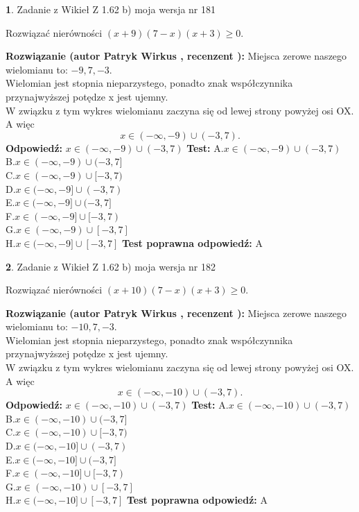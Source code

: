 \documentclass[12pt, a4paper]{article}
\theoremstyle{definition} %
\newtheorem{zad}{}
\newcommand{\zadStart}[1]{\begin{zad}#1\newline}
\newcommand{\zadStop}{\end{zad}}
\newcommand{\rozwStart}[2]{\noindent \textbf{Rozwiązanie (autor #1 , recenzent #2): }\newline}
\newcommand{\rozwStop}{\newline}
\newcommand{\odpStart}{\noindent \textbf{Odpowiedź:}\newline}
\newcommand{\odpStop}{\newline}
\newcommand{\testStart}{\noindent \textbf{Test:}\newline}
\newcommand{\testStop}{\newline}
\newcommand{\kluczStart}{\noindent \textbf{Test poprawna odpowiedź:}\newline}
\newcommand{\kluczStop}{\newline}
\begin{document}
\zadStart{Zadanie z Wikieł Z 1.62 b) moja wersja nr 181}

Rozwiązać nierówności $(x+9)(7-x)(x+3)\ge0$.
\zadStop
\rozwStart{Patryk Wirkus}{}
Miejsca zerowe naszego wielomianu to: $-9, 7, -3$.\\
Wielomian jest stopnia nieparzystego, ponadto znak współczynnika przy\linebreak najwyższej potędze x jest ujemny.\\ W związku z tym wykres wielomianu zaczyna się od lewej strony powyżej osi OX. A więc $$x \in (-\infty,-9) \cup (-3,7).$$
\rozwStop
\odpStart
$x \in (-\infty,-9) \cup (-3,7)$
\odpStop
\testStart
A.$x \in (-\infty,-9) \cup (-3,7)$\\
B.$x \in (-\infty,-9) \cup (-3,7]$\\
C.$x \in (-\infty,-9) \cup [-3,7)$\\
D.$x \in (-\infty,-9] \cup (-3,7)$\\
E.$x \in (-\infty,-9] \cup (-3,7]$\\
F.$x \in (-\infty,-9] \cup [-3,7)$\\
G.$x \in (-\infty,-9) \cup [-3,7]$\\
H.$x \in (-\infty,-9] \cup [-3,7]$
\testStop
\kluczStart
A
\kluczStop



\zadStart{Zadanie z Wikieł Z 1.62 b) moja wersja nr 182}

Rozwiązać nierówności $(x+10)(7-x)(x+3)\ge0$.
\zadStop
\rozwStart{Patryk Wirkus}{}
Miejsca zerowe naszego wielomianu to: $-10, 7, -3$.\\
Wielomian jest stopnia nieparzystego, ponadto znak współczynnika przy\linebreak najwyższej potędze x jest ujemny.\\ W związku z tym wykres wielomianu zaczyna się od lewej strony powyżej osi OX. A więc $$x \in (-\infty,-10) \cup (-3,7).$$
\rozwStop
\odpStart
$x \in (-\infty,-10) \cup (-3,7)$
\odpStop
\testStart
A.$x \in (-\infty,-10) \cup (-3,7)$\\
B.$x \in (-\infty,-10) \cup (-3,7]$\\
C.$x \in (-\infty,-10) \cup [-3,7)$\\
D.$x \in (-\infty,-10] \cup (-3,7)$\\
E.$x \in (-\infty,-10] \cup (-3,7]$\\
F.$x \in (-\infty,-10] \cup [-3,7)$\\
G.$x \in (-\infty,-10) \cup [-3,7]$\\
H.$x \in (-\infty,-10] \cup [-3,7]$
\testStop
\kluczStart
A
\kluczStop
\end{document}
